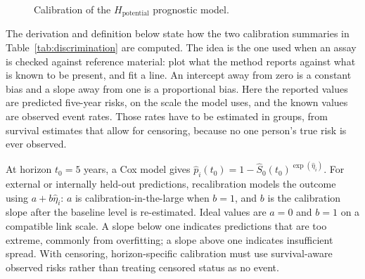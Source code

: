 \begin{figure}[htbp]
\centering
{}
\captionsetup{justification=justified, width=\linewidth}
\caption{Calibration of the $H_{\text{potential}}$ prognostic model.}
\label{fig:calibration_plot}
\end{figure}

The derivation and definition below state how the two calibration summaries in Table~\ref{tab:discrimination} are computed. The idea is the one used when an assay is checked against reference material: plot what the method reports against what is known to be present, and fit a line. An intercept away from zero is a constant bias and a slope away from one is a proportional bias. Here the reported values are predicted five-year risks, on the scale the model uses, and the known values are observed event rates. Those rates have to be estimated in groups, from survival estimates that allow for censoring, because no one person's true risk is ever observed.

\begin{derivation}
\label{der:calibration}
At horizon $t_0=5$ years, a Cox model gives
$\widehat p_i(t_0)=1-\widehat S_0(t_0)^{\exp(\widehat\eta_i)}$.
For external or internally held-out predictions, recalibration models the outcome
using $a+b\widehat\eta_i$: $a$ is calibration-in-the-large when $b=1$, and $b$
is the calibration slope after the baseline level is re-estimated. Ideal values
are $a=0$ and $b=1$ on a compatible link scale. A slope below one indicates
predictions that are too extreme, commonly from overfitting; a slope above one
indicates insufficient spread. With censoring, horizon-specific calibration must
use survival-aware observed risks rather than treating censored status as no event.
\end{derivation}

